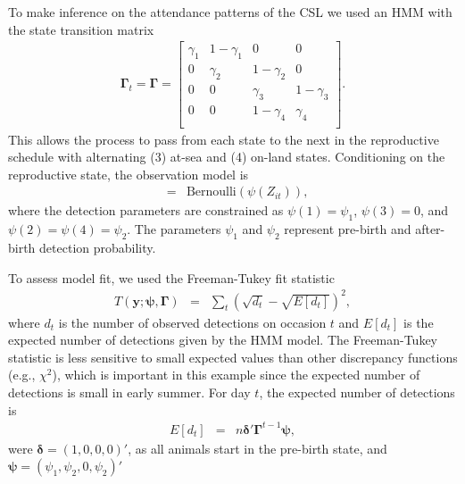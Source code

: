 \documentclass[12pt,english]{article}
\begin{document}
\begin{spacing}{1.9}
To make inference on the attendance patterns of the CSL we used an HMM
with the state transition matrix
\begin{eqnarray*}
  \boldsymbol{\Gamma}_t = \boldsymbol{\Gamma} =
  \left[ {\begin{array}{cccc}
            \gamma_1 & 1-\gamma_1 & 0 & 0 \\
            0 & \gamma_2 & 1-\gamma_2 & 0 \\
            0 & 0 & \gamma_3 & 1-\gamma_3 \\
            0 & 0 & 1-\gamma_4 & \gamma_4 \\
          \end{array} } \right].
\end{eqnarray*}
This allows the process to pass from each state to the next in the
reproductive schedule with alternating (3) at-sea and (4) on-land
states. Conditioning on the reproductive state, the observation model
is
\begin{eqnarray*}
  [y_{it}|Z_{it}] & = & \text{Bernoulli}(\psi(Z_{it})),
\end{eqnarray*}
where the detection parameters are constrained as $\psi(1) = \psi_1$,
$\psi(3) = 0$, and $\psi(2) = \psi(4) = \psi_2$. The parameters
$\psi_1$ and $\psi_2$ represent pre-birth and after-birth detection
probability.

To assess model fit, we used the Freeman-Tukey fit statistic
\begin{eqnarray*}
  T(\mathbf{y}; \boldsymbol{\psi},\boldsymbol{\Gamma}) & = &  \sum_t\left(\sqrt{d_t} - \sqrt{E[d_t]}\right)^2,
\end{eqnarray*}
where $d_t$ is the number of observed detections on occasion $t$ and
$E[d_t]$ is the expected number of detections given by the HMM
model. The Freeman-Tukey statistic is less sensitive to small expected values than other discrepancy
functions (e.g., $\chi^2$),
which is important in this example since the expected number of detections is small in early summer.
For day $t$, the expected number of detections is
\begin{eqnarray*}
  E[d_t] & = & n \boldsymbol{\delta}'\boldsymbol{\Gamma}^{t-1}\boldsymbol{\psi},
\end{eqnarray*}
were $\boldsymbol{\delta} = (1, 0, 0, 0)'$, as all animals start in
the pre-birth state, and
$\boldsymbol{\psi} = (\psi_1 , \psi_2 , 0 , \psi_2)'$


\end{spacing}
\end{document}
